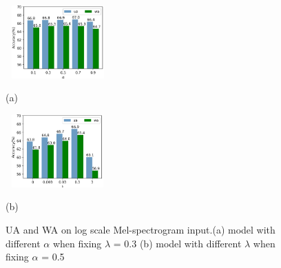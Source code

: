 \documentclass{article}
\begin{document}
\begin{figure}[htb]	
	\begin{minipage}[b]{0.48\linewidth}
		\label{fig:metric_lambda_alpha_a}
		\centering
		\centerline{\includegraphics[width=4cm, height=2.8cm]{fig4_alpha.png}}
		\centerline{(a)}\medskip
		
	\end{minipage}
	\hfill
	\begin{minipage}[b]{.48\linewidth}
		\centering
		\centerline{\includegraphics[width=4cm,height=2.8cm]{fig4_lambda.png}}
		\centerline{(b)  }\medskip
		\label{fig:metric_lambda_alpha_b}
	\end{minipage}
	\caption{UA and WA on log scale Mel-spectrogram input.(a) model with different $\alpha$ when fixing $\lambda$ = 0.3 (b) model with different $\lambda$ when fixing $\alpha$ = 0.5}
	\label{fig:metric_lambda_alpha}
\end{figure}
\end{document}
